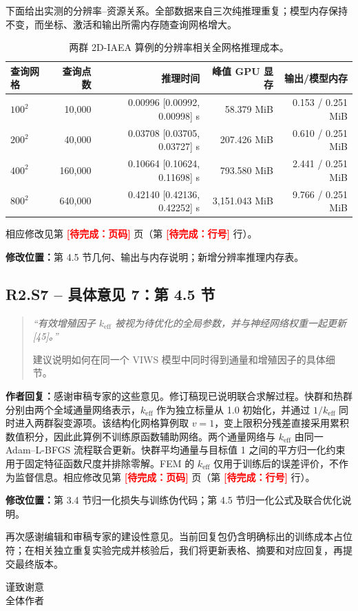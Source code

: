 \documentclass[11pt,a4paper]{article}
\newenvironment{reviewercomment}{\begin{quote}\small\itshape\color{commentgray}}{\end{quote}}
\newcommand{\authorresponse}{\noindent\textbf{作者回复：}\quad}
\newcommand{\revisionlocation}[1]{\par\noindent\textcolor{locationblue}{\textbf{修改位置：}}#1}
\newcommand{\draftplaceholder}[1]{\textcolor{red}{\textbf{[待完成：#1]}}}
\begin{document}
下面给出实测的分辨率--资源关系。全部数据来自三次纯推理重复；模型内存保持不变，而坐标、激活和输出所需内存随查询网格增大。

\begin{table}[H]
\centering
\small
\caption{两群 2D-IAEA 算例的分辨率相关全网格推理成本。}
\label{tab:response_iaea_memory_zh}
\renewcommand{\arraystretch}{1.15}
\begin{tabularx}{\textwidth}{@{}lrrrr@{}}
\toprule
查询网格 & 查询点数 & 推理时间 & 峰值 GPU 显存 & 输出/模型内存 \\
\midrule
$100^2$ & 10,000 & 0.00996 [0.00992, 0.00998] s & 58.379 MiB & 0.153 / 0.251 MiB \\
$200^2$ & 40,000 & 0.03708 [0.03705, 0.03727] s & 207.426 MiB & 0.610 / 0.251 MiB \\
$400^2$ & 160,000 & 0.10664 [0.10624, 0.11698] s & 793.580 MiB & 2.441 / 0.251 MiB \\
$800^2$ & 640,000 & 0.42140 [0.42136, 0.42252] s & 3,151.043 MiB & 9.766 / 0.251 MiB \\
\bottomrule
\end{tabularx}
\end{table}
相应修改见第 \draftplaceholder{页码} 页（第 \draftplaceholder{行号} 行）。
\revisionlocation{第 4.5 节几何、输出与内存说明；新增分辨率推理内存表。}

\subsection*{R2.S7 -- 具体意见 7：第 4.5 节}
\begin{reviewercomment}
“有效增殖因子 $k_{\mathrm{eff}}$ 被视为待优化的全局参数，并与神经网络权重一起更新 [45]。”

建议说明如何在同一个 VIWS 模型中同时得到通量和增殖因子的具体细节。
\end{reviewercomment}
\authorresponse 感谢审稿专家的这些意见。修订稿现已说明联合求解过程。快群和热群分别由两个全域通量网络表示，$k_{\mathrm{eff}}$ 作为独立标量从 1.0 初始化，并通过 $1/k_{\mathrm{eff}}$ 同时进入两群裂变源项。该结构化网格算例取 $v=1$，变上限积分残差直接采用累积数值积分，因此此算例不训练原函数辅助网络。两个通量网络与 $k_{\mathrm{eff}}$ 由同一 Adam--L-BFGS 流程联合更新。快群平均通量与目标值 1 之间的平方归一化约束用于固定特征函数尺度并排除零解。FEM 的 $k_{\mathrm{eff}}$ 仅用于训练后的误差评价，不作为监督信息。相应修改见第 \draftplaceholder{页码} 页（第 \draftplaceholder{行号} 行）。
\revisionlocation{第 3.4 节归一化损失与训练伪代码；第 4.5 节归一化公式及联合优化说明。}

\enlargethispage{3\baselineskip}
\vspace{0.5em}
再次感谢编辑和审稿专家的建设性意见。当前回复包仍含明确标出的训练成本占位符；在相关独立重复实验完成并核验后，我们将更新表格、摘要和对应回复，再提交最终版本。

\begin{flushright}
谨致谢意\\
全体作者
\end{flushright}
\end{document}

